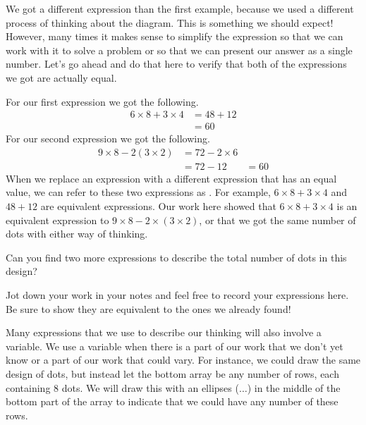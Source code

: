 \documentclass{ximera}
\begin{document}
We got a different expression than the first example, because we used a different process of thinking about the diagram. This is something we should expect! However, many times it makes sense to simplify the expression so that we can work with it to solve a problem or so that we can present our answer as a single number. Let's go ahead and do that here to verify that both of the expressions we got are actually equal. 

For our first expression we got the following.
\begin{align*}
6 \times 8 + 3 \times 4 &= 48 + 12 \\
&= 60
\end{align*}
For our second expression we got the following.
\begin{align*}
9 \times 8 - 2 \left ( 3 \times 2 \right ) &=  72 - 2\times 6\\
&= 72 - 12
&= 60
\end{align*}
When we replace an expression with a different expression that has an equal value, we can refer to these two expressions as . For example, $6 \times 8 + 3 \times 4$ and $48 + 12$ are equivalent expressions. Our work here showed that $6 \times 8 + 3 \times 4$ is an equivalent expression to $9 \times 8 - 2\times (3 \times 2)$, or that we got the same number of dots with either way of thinking.

\begin{question}
Can you find two more expressions to describe the total number of dots in this design?
\begin{freeResponse}
Jot down your work in your notes and feel free to record your expressions here. Be sure to show they are equivalent to the ones we already found!
\end{freeResponse}
\end{question}

Many expressions that we use to describe our thinking will also involve a variable. We use a variable when there is a part of our work that we don't yet know or a part of our work that could vary. For instance, we could draw the same design of dots, but instead let the bottom array be any number of rows, each containing $8$ dots. We will draw this with an ellipses ($\dots$) in the middle of the bottom part of the array to indicate that we could have any number of these rows.

\begin{image}
\end{image}
\end{document}
